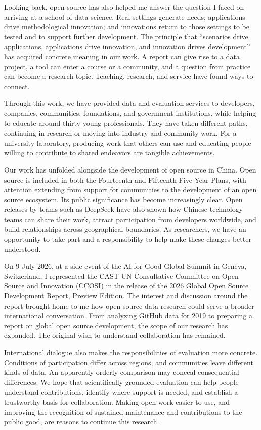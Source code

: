 Looking back, open source has also helped me answer the question I faced on arriving at a school of data science. Real settings generate needs; applications drive methodological innovation; and innovations return to those settings to be tested and to support further development. The principle that “scenarios drive applications, applications drive innovation, and innovation drives development” has acquired concrete meaning in our work. A report can give rise to a data project, a tool can enter a course or a community, and a question from practice can become a research topic. Teaching, research, and service have found ways to connect.

Through this work, we have provided data and evaluation services to developers, companies, communities, foundations, and government institutions, while helping to educate around thirty young professionals. They have taken different paths, continuing in research or moving into industry and community work. For a university laboratory, producing work that others can use and educating people willing to contribute to shared endeavors are tangible achievements.

Our work has unfolded alongside the development of open source in China. Open source is included in both the Fourteenth and Fifteenth Five-Year Plans, with attention extending from support for communities to the development of an open source ecosystem. Its public significance has become increasingly clear. Open releases by teams such as DeepSeek have also shown how Chinese technology teams can share their work, attract participation from developers worldwide, and build relationships across geographical boundaries. As researchers, we have an opportunity to take part and a responsibility to help make these changes better understood.

On 9 July 2026, at a side event of the AI for Good Global Summit in Geneva, Switzerland, I represented the CAST UN Consultative Committee on Open Source and Innovation (CCOSI) in the release of the 2026 Global Open Source Development Report, Preview Edition. The interest and discussion around the report brought home to me how open source data research could serve a broader international conversation. From analyzing GitHub data for 2019 to preparing a report on global open source development, the scope of our research has expanded. The original wish to understand collaboration has remained.

International dialogue also makes the responsibilities of evaluation more concrete. Conditions of participation differ across regions, and communities leave different kinds of data. An apparently orderly comparison may conceal consequential differences. We hope that scientifically grounded evaluation can help people understand contributions, identify where support is needed, and establish a trustworthy basis for collaboration. Making open work easier to use, and improving the recognition of sustained maintenance and contributions to the public good, are reasons to continue this research.

